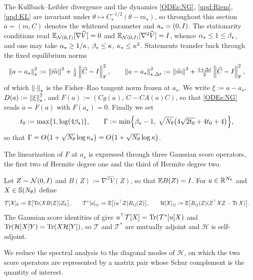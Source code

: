 The Kullback--Leibler divergence and the dynamics \eqref{ODEs:NG}, \eqref{upd:Riem},
\eqref{upd:KL} are invariant under $\theta\mapsto C_\star^{-1/2}(\theta-m_\star)$, so throughout
this section $a=(m,C)$ denotes the whitened parameter and $a_\star=(0,I)$. The stationarity
conditions read $\mathbb{E}_{\mathcal{N}(0,I)}[\nabla\widehat V]=0$ and
$\mathbb{E}_{\mathcal{N}(0,I)}[\nabla^2\widehat V]=I$, whence $\alpha_\star\leq1\leq\beta_\star$, and one may
take $\alpha_\star\geq1/\kappa$, $\beta_\star\leq\kappa$, $\kappa_\star\leq\kappa^2$. Statements
transfer back through the fixed equilibrium norms
\begin{equation}
\label{eq:local-norms}
    \left\lVert a-a_\star\right\rVert_\star^2:=\left\lVert \widehat m\right\rVert^2+\tfrac12\left\lVert \widehat C-I\right\rVert_{\mathrm{F}}^2,
    \qquad
    \left\lVert a-a_\star\right\rVert_{\star,\Delta t}^2:=\left\lVert \widehat m\right\rVert^2+\tfrac{1+\Delta t}2\left\lVert \widehat C-I\right\rVert_{\mathrm{F}}^2,
\end{equation}
of which $\left\lVert \cdot\right\rVert_\star$ is the Fisher--Rao tangent norm frozen at $a_\star$. We write
$\xi:=a-a_\star$, $D(a):=\left\lVert \xi\right\rVert_\star^2$, and $F(a):=(Cg(a),\,C-CA(a)C)$, so that
\eqref{ODEs:NG} reads $\dot a=F(a)$ with $F(a_\star)=0$. Finally we set
\begin{equation}
\label{eq:Gamma}
    t_0:=\max\{1,\log(4\beta_\star)\},
    \qquad
    \Gamma:=\min\Bigl\{\beta_\star-1,\;\sqrt{N_\theta}\bigl(4\sqrt{2t_0}+4t_0+4\bigr)\Bigr\},
\end{equation}
so that $\Gamma=O\bigl(1+\sqrt{N_\theta}\log\kappa_\star\bigr)=O\bigl(1+\sqrt{N_\theta}\log\kappa\bigr)$.

The linearization of $F$ at $a_\star$ is expressed through three Gaussian score operators, the
first two of Hermite degree one and the third of Hermite degree two.

\begin{definition}
\label{def:score-ops}
Let $Z\sim\mathcal{N}(0,I)$ and $B(Z):=\nabla^2\widehat V(Z)$, so that $\mathbb{E} B(Z)=I$. For
$u\in\mathbb{R}^{N_\theta}$ and $X\in\mathbb{S}(N_\theta)$ define
\[
    \mathcal T[X]_k:=\mathbb{E}\bigl[\operatorname{Tr}(XB(Z))Z_k\bigr],
    \qquad
    \mathcal T^*[u]_{ij}:=\mathbb{E}\bigl[(u^\top Z)B_{ij}(Z)\bigr],
    \qquad
    \mathcal H[X]_{ij}:=\mathbb{E}\bigl[B_{ij}(Z)(Z^\top XZ-\operatorname{Tr} X)\bigr].
\]
The Gaussian score identities of  give
$u^\top\mathcal T[X]=\operatorname{Tr}(\mathcal T^*[u]X)$ and $\operatorname{Tr}(\mathcal H[X]Y)=\operatorname{Tr}(X\mathcal H[Y])$, so
$\mathcal T$ and $\mathcal T^*$ are mutually adjoint and $\mathcal H$ is self-adjoint.
\end{definition}

We reduce the spectral analysis to the diagonal modes of $\mathcal H$, on which the two
score operators are represented by a matrix pair whose Schur complement is the quantity of
interest.

